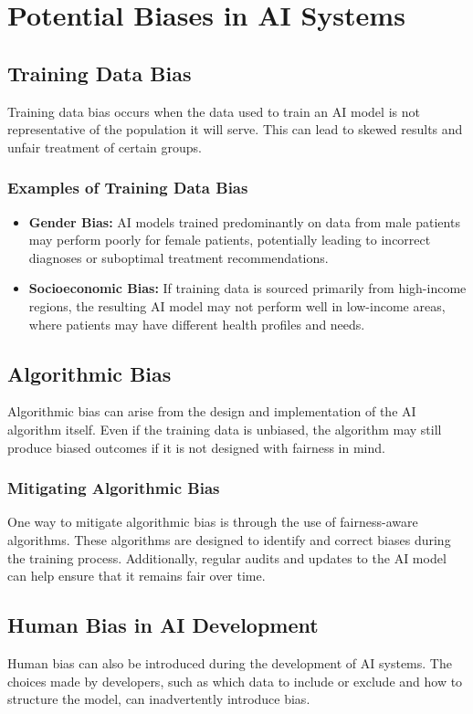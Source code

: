 \documentclass{article}
\begin{document}
\section{Potential Biases in AI Systems}

\subsection{Training Data Bias}
Training data bias occurs when the data used to train an AI model is not representative of the population it will serve. This can lead to skewed results and unfair treatment of certain groups.

\subsubsection{Examples of Training Data Bias}
\begin{itemize}
    \item \textbf{Gender Bias:} AI models trained predominantly on data from male patients may perform poorly for female patients, potentially leading to incorrect diagnoses or suboptimal treatment recommendations.
    \item \textbf{Socioeconomic Bias:} If training data is sourced primarily from high-income regions, the resulting AI model may not perform well in low-income areas, where patients may have different health profiles and needs.
\end{itemize}

\subsection{Algorithmic Bias}
Algorithmic bias can arise from the design and implementation of the AI algorithm itself. Even if the training data is unbiased, the algorithm may still produce biased outcomes if it is not designed with fairness in mind.

\subsubsection{Mitigating Algorithmic Bias}
One way to mitigate algorithmic bias is through the use of fairness-aware algorithms. These algorithms are designed to identify and correct biases during the training process. Additionally, regular audits and updates to the AI model can help ensure that it remains fair over time.

\subsection{Human Bias in AI Development}
Human bias can also be introduced during the development of AI systems. The choices made by developers, such as which data to include or exclude and how to structure the model, can inadvertently introduce bias.
\end{document}
